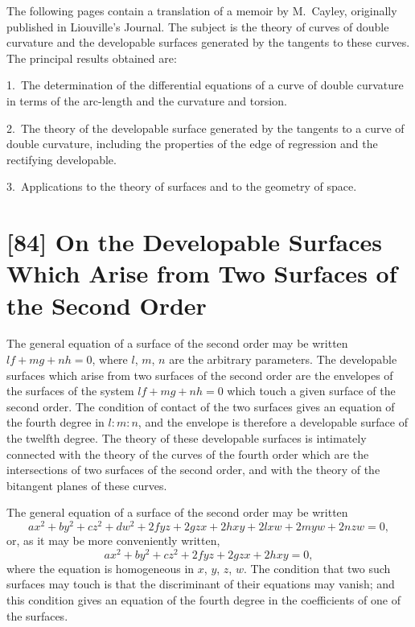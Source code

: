 \documentclass[12pt,a4paper]{article}
\begin{document}
\medskip

The following pages contain a translation of a memoir by M.~Cayley, originally published in Liouville's Journal. The subject is the theory of curves of double curvature and the developable surfaces generated by the tangents to these curves. The principal results obtained are:

1.~The determination of the differential equations of a curve of double curvature in terms of the arc-length and the curvature and torsion.

2.~The theory of the developable surface generated by the tangents to a curve of double curvature, including the properties of the edge of regression and the rectifying developable.

3.~Applications to the theory of surfaces and to the geometry of space.

\newpage
\section*{[84] On the Developable Surfaces Which Arise from Two Surfaces of the Second Order}

\bigskip

The general equation of a surface of the second order may be written $lf + mg + nh = 0$, where $l$, $m$, $n$ are the arbitrary parameters. The developable surfaces which arise from two surfaces of the second order are the envelopes of the surfaces of the system $lf + mg + nh = 0$ which touch a given surface of the second order. The condition of contact of the two surfaces gives an equation of the fourth degree in $l : m : n$, and the envelope is therefore a developable surface of the twelfth degree. The theory of these developable surfaces is intimately connected with the theory of the curves of the fourth order which are the intersections of two surfaces of the second order, and with the theory of the bitangent planes of these curves.

The general equation of a surface of the second order may be written
\[
ax^2 + by^2 + cz^2 + dw^2 + 2fyz + 2gzx + 2hxy + 2lxw + 2myw + 2nzw = 0,
\]
or, as it may be more conveniently written,
\[
ax^2 + by^2 + cz^2 + 2fyz + 2gzx + 2hxy = 0,
\]
where the equation is homogeneous in $x$, $y$, $z$, $w$. The condition that two such surfaces may touch is that the discriminant of their equations may vanish; and this condition gives an equation of the fourth degree in the coefficients of one of the surfaces.
\end{document}
